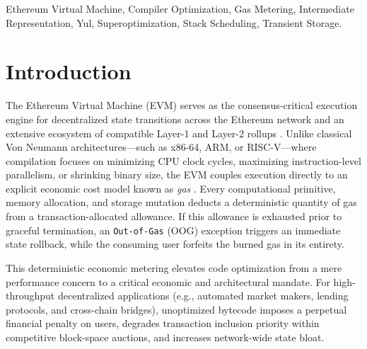 \documentclass[conference]{IEEEtran}
\begin{document}
\begin{IEEEkeywords}
Ethereum Virtual Machine, Compiler Optimization, Gas Metering, Intermediate Representation, Yul, Superoptimization, Stack Scheduling, Transient Storage.
\end{IEEEkeywords}

\section{Introduction}
The Ethereum Virtual Machine (EVM) serves as the consensus-critical execution engine for decentralized state transitions across the Ethereum network and an extensive ecosystem of compatible Layer-1 and Layer-2 rollups \cite{wood2014ethereum, buterin2014next}. Unlike classical Von Neumann architectures---such as x86-64, ARM, or RISC-V---where compilation focuses on minimizing CPU clock cycles, maximizing instruction-level parallelism, or shrinking binary size, the EVM couples execution directly to an explicit economic cost model known as \emph{gas} \cite{wood2014ethereum}. Every computational primitive, memory allocation, and storage mutation deducts a deterministic quantity of gas from a transaction-allocated allowance. If this allowance is exhausted prior to graceful termination, an \texttt{Out-of-Gas} (OOG) exception triggers an immediate state rollback, while the consuming user forfeits the burned gas in its entirety.

This deterministic economic metering elevates code optimization from a mere performance concern to a critical economic and architectural mandate. For high-throughput decentralized applications (e.g., automated market makers, lending protocols, and cross-chain bridges), unoptimized bytecode imposes a perpetual financial penalty on users, degrades transaction inclusion priority within competitive block-space auctions, and increases network-wide state bloat.
\end{document}

